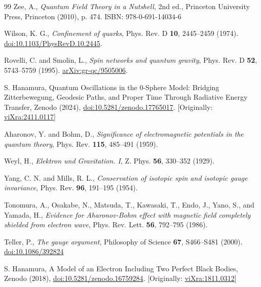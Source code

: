 \documentclass[%
 reprint,
 amsmath,amssymb,
 aps,
]{revtex4-1}
\numberwithin{equation}{section}%
\begin{document}
\newpage



\begin{thebibliography}{99}
 Zee, A., 
\textit{Quantum Field Theory in a Nutshell}, 
2nd ed., Princeton University Press, Princeton (2010), p. 474. 
ISBN: 978-0-691-14034-6

 Wilson, K. G., 
\textit{Confinement of quarks}, 
Phys. Rev. D \textbf{10}, 2445--2459 (1974). 
\href{https://link.aps.org/doi/10.1103/PhysRevD.10.2445}{doi:10.1103/PhysRevD.10.2445}.

 Rovelli, C. and Smolin, L., 
\textit{Spin networks and quantum gravity}, 
Phys. Rev. D \textbf{52}, 5743--5759 (1995). 
\href{https://arxiv.org/abs/gr-qc/9505006}{arXiv:gr-qc/9505006}.

S. Hanamura, Quantum Oscillations in the 0-Sphere Model: Bridging Zitterbewegung, Geodesic Paths, and Proper Time Through Radiative Energy Transfer, Zenodo (2024), \href{https://doi.org/10.5281/zenodo.17765017}{doi:10.5281/zenodo.17765017}. [Originally: \href{https://vixra.org/abs/2411.0117}{viXra:2411.0117}]

 Aharonov, Y. and Bohm, D.,
\textit{Significance of electromagnetic potentials in the quantum theory},
Phys. Rev. \textbf{115}, 485--491 (1959).

 Weyl, H.,
\textit{Elektron und Gravitation. I},
Z. Phys. \textbf{56}, 330--352 (1929).

 Yang, C. N. and Mills, R. L.,
\textit{Conservation of isotopic spin and isotopic gauge invariance},
Phys. Rev. \textbf{96}, 191--195 (1954).

 Tonomura, A., Osakabe, N., Matsuda, T., Kawasaki, T., Endo, J., Yano, S., and Yamada, H.,
\textit{Evidence for Aharonov-Bohm effect with magnetic field completely shielded from electron wave},
Phys. Rev. Lett. \textbf{56}, 792--795 (1986).

 Teller, P.,
\textit{The gauge argument},
Philosophy of Science \textbf{67}, S466--S481 (2000).
\href{https://doi.org/10.1086/392824}{doi:10.1086/392824}

S. Hanamura, A Model of an Electron Including Two Perfect Black Bodies, Zenodo (2018), \href{https://doi.org/10.5281/zenodo.16759284}{doi:10.5281/zenodo.16759284}. [Originally: \href{https://vixra.org/abs/1811.0312}{viXra:1811.0312}]


\end{thebibliography}
\end{document}
